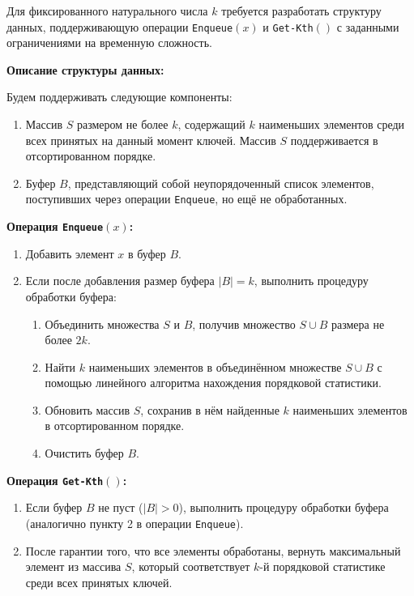 \documentclass[11pt]{article}
\begin{document}
\begin{solution}
    Для фиксированного натурального числа $k$ требуется разработать структуру данных, поддерживающую операции \texttt{Enqueue}$(x)$ и \texttt{Get-Kth}$()$ с заданными ограничениями на временную сложность.

    \textbf{Описание структуры данных:}

    Будем поддерживать следующие компоненты:

    \begin{enumerate}
        \item Массив $S$ размером не более $k$, содержащий $k$ наименьших элементов среди всех принятых на данный момент ключей. Массив $S$ поддерживается в отсортированном порядке.
        \item Буфер $B$, представляющий собой неупорядоченный список элементов, поступивших через операции \texttt{Enqueue}, но ещё не обработанных.
    \end{enumerate}

    \textbf{Операция \texttt{Enqueue}$(x)$:}

    \begin{enumerate}
        \item Добавить элемент $x$ в буфер $B$.
        \item Если после добавления размер буфера $|B| = k$, выполнить процедуру обработки буфера:
              \begin{enumerate}
                  \item Объединить множества $S$ и $B$, получив множество $S \cup B$ размера не более $2k$.
                  \item Найти $k$ наименьших элементов в объединённом множестве $S \cup B$ с помощью линейного алгоритма нахождения порядковой статистики.
                  \item Обновить массив $S$, сохранив в нём найденные $k$ наименьших элементов в отсортированном порядке.
                  \item Очистить буфер $B$.
              \end{enumerate}
    \end{enumerate}

    \textbf{Операция \texttt{Get-Kth}$()$:}

    \begin{enumerate}
        \item Если буфер $B$ не пуст ($|B| > 0$), выполнить процедуру обработки буфера (аналогично пункту 2 в операции \texttt{Enqueue}).
        \item После гарантии того, что все элементы обработаны, вернуть максимальный элемент из массива $S$, который соответствует $k$-й порядковой статистике среди всех принятых ключей.
    \end{enumerate}


\end{solution}
\end{document}

